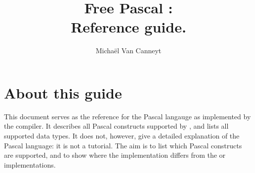 %
%
%
%
%

\begin{latexonly}
  \ifpdf
  \fi
\end{latexonly}

%
%
\makeindex
%
%
\usepackage{syntax}

%
%

\title{Free Pascal :\\ Reference guide.}

\author{Micha\"el Van Canneyt}
\maketitle
\tableofcontents
\newpage
\listoftables
\newpage




\section*{About this guide}
This document serves as the reference for the Pascal langauge as implemented
by the \fpc compiler. It describes all Pascal constructs supported by 
\fpc, and lists all supported data types. It does not, however, give a 
detailed explanation of the Pascal language: it is not a tutorial. 
The aim is to list which Pascal constructs are supported, and to show 
where the \fpc implementation differs from the \tp or \delphi
implementations. 

